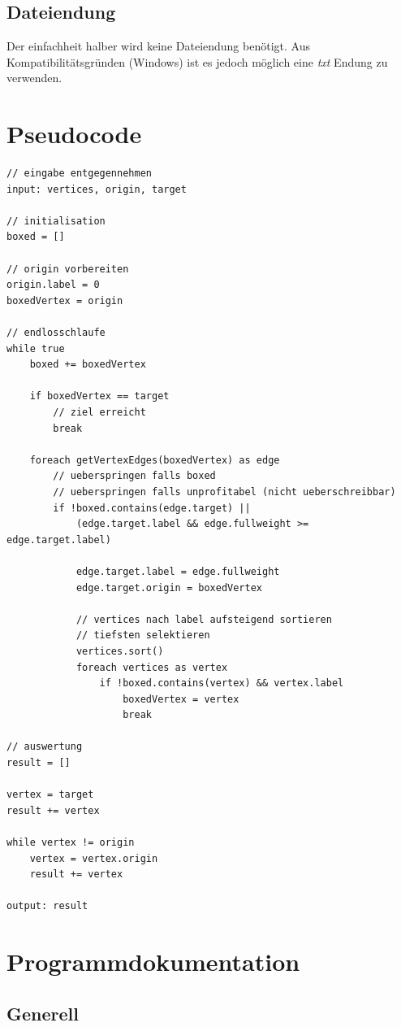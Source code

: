 \documentclass[a4paper,titlepage]{article}
\begin{document}
\subsection{Dateiendung}

Der einfachheit halber wird keine Dateiendung benötigt. Aus Kompatibilitätsgründen (Windows) ist es jedoch möglich eine \emph{txt} Endung zu verwenden.

\newpage

\section{Pseudocode}

\begin{lstlisting}
// eingabe entgegennehmen
input: vertices, origin, target

// initialisation
boxed = []

// origin vorbereiten
origin.label = 0
boxedVertex = origin

// endlosschlaufe
while true
	boxed += boxedVertex

	if boxedVertex == target
		// ziel erreicht
		break

	foreach getVertexEdges(boxedVertex) as edge
		// ueberspringen falls boxed
		// ueberspringen falls unprofitabel (nicht ueberschreibbar)
		if !boxed.contains(edge.target) ||
			(edge.target.label && edge.fullweight >= edge.target.label)

			edge.target.label = edge.fullweight
			edge.target.origin = boxedVertex

			// vertices nach label aufsteigend sortieren
			// tiefsten selektieren
			vertices.sort()
			foreach vertices as vertex
				if !boxed.contains(vertex) && vertex.label
					boxedVertex = vertex
					break

// auswertung
result = []

vertex = target
result += vertex

while vertex != origin
	vertex = vertex.origin
	result += vertex

output: result
\end{lstlisting}

\newpage

\section{Programmdokumentation}

\subsection{Generell}
\end{document}
